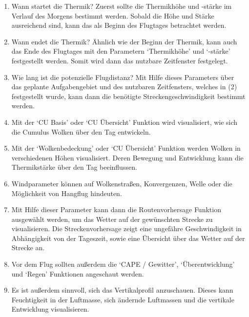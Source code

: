 \documentclass[11pt,a4paper]{article}
\begin{document}
\begin{enumerate}
\item Wann startet die Thermik? Zuerst sollte die Thermikhöhe und -stärke im Verlauf des Morgens bestimmt werden. Sobald die Höhe und Stärke ausreichend sind, kann das als Beginn des Flugtages betrachtet werden.
\item Wann endet die Thermik? Ähnlich wie der Beginn der Thermik, kann auch das Ende des Flugtages mit den Parametern `Thermikhöhe' und `-stärke' festgestellt werden. Somit wird dann das nutzbare Zeitfenster festgelegt.
\item Wie lang ist die potenzielle Flugdistanz? Mit Hilfe dieses Parameters über das geplante Aufgabengebiet und des nutzbaren Zeitfensters, welches in (2) festgestellt wurde, kann dann die benötigte Streckengeschwindigkeit bestimmt werden.
\item Mit der `CU Basis' oder `CU Übersicht' Funktion wird visualisiert, wie sich die Cumulus Wolken über den Tag entwickeln. 
\item Mit der `Wolkenbedeckung' oder `CU Übersicht' Funktion werden Wolken in verschiedenen Höhen visualisiert. Deren Bewegung und Entwicklung kann die Thermikstärke über den Tag beeinflussen. 
\item Windparameter können auf Wolkenstraßen, Konvergenzen, Welle oder die Möglichkeit von Hangflug hindeuten. 
\item Mit Hilfe dieser Parameter kann dann die Routenvorhersage Funktion ausgewählt werden, um das Wetter auf der gewünschten Strecke zu visualisieren. Die Streckenvorhersage zeigt eine ungefähre Geschwindigkeit in Abhängigkeit von der Tageszeit, sowie eine Übersicht über das Wetter auf der Strecke an. 
\item Vor dem Flug sollten außerdem die `CAPE / Gewitter', `Überentwicklung' und `Regen' Funktionen angeschaut werden.
\item Es ist außerdem sinnvoll, sich das Vertikalprofil anzuschauen. Dieses kann Feuchtigkeit in der Luftmasse, sich ändernde Luftmassen und die vertikale Entwicklung visualisieren.
\end{enumerate}
\end{document}
